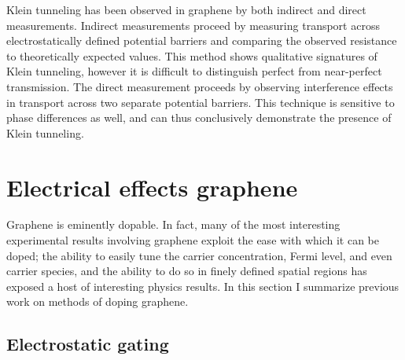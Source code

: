 \documentclass[edeposit,fullpage,draftthesis]{uiucthesis2009}
\begin{document}
        Klein tunneling has been observed in graphene
        by both indirect \cite{Huard2007, stander2009evidence} and direct \cite{young2009quantum} measurements. 
        Indirect measurements proceed by measuring transport across electrostatically 
        defined potential barriers and comparing
        the observed resistance to theoretically expected values. This method shows qualitative
        signatures of Klein tunneling, however it is difficult to distinguish perfect from near-perfect
        transmission. The direct measurement proceeds by observing interference effects in transport
        across two separate potential barriers. This technique is sensitive to phase differences as
        well, and can thus conclusively demonstrate the presence of Klein tunneling.
        
        
    \section{Electrical effects graphene}
    
        Graphene is eminently dopable. In fact, many of the most interesting experimental
        results involving graphene exploit the ease with which it can be doped; the 
        ability to easily tune the carrier concentration, Fermi level, and even carrier
        species, and the ability to do so in finely defined spatial regions has exposed
        a host of interesting physics results. In this section I summarize previous work
        on methods of doping graphene.
        
        \subsection{Electrostatic gating}
      
\end{document}
